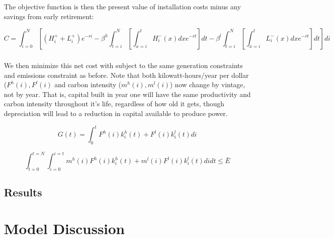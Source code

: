 \documentclass{easychithesis}
\begin{document}
\paragraph{} The objective function is then the present value of installation costs minus any savings from early retirement:

\begin{equation}\label{eq:VintObj}
C = \int_{i=0}^N  \left[ (H^+_i + L^+_i)e^{-ri}  - \beta^h  \int_{t=i}^N \left[\int_{x=i}^t H^-_i(x) dx e^{-rt}\right] dt - \beta^l  \int_{t=i}^N \left[\int_{x=i}^t L^-_i(x) dx e^{-rt}\right] dt\right] di
\end{equation}

\paragraph{} We then minimize this net cost with subject to the same generation constraints and emissions constraint as before. Note that both kilowatt-hours/year per dollar ($F^h(i), F^l(i)$ and carbon intensity ($m^h(i), m^l(i)$) now change by vintage, not by year. That is, capital built in year one will have the same productivity and carbon intensity throughout it's life, regardless of how old it gets, though depreciation will lead to a reduction in capital available to produce power. 

\begin{equation}
G(t) = \int_0^t F^h(i)k_i^h(t) + F^l(i)k_i^l(t) di
\end{equation}

\begin{equation}
\int_{t=0}^{t=N}\int_{i=0}^{i=t} m^h(i)F^h(i)k_i^h(t) + m^l(i)F^l(i)k_i^l(t) di dt \leq \bar{E}
\end{equation}

\section{Results}




\chapter{Model Discussion}
\end{document}
